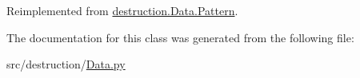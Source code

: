 Reimplemented from \hyperlink{classdestruction_1_1_data_1_1_pattern_a4c77fd60c495b8397e7cd06de3c08630}{destruction.\-Data.\-Pattern}.



The documentation for this class was generated from the following file\-:\begin{DoxyCompactItemize}
\item 
src/destruction/\hyperlink{_data_8py}{Data.\-py}\end{DoxyCompactItemize}
